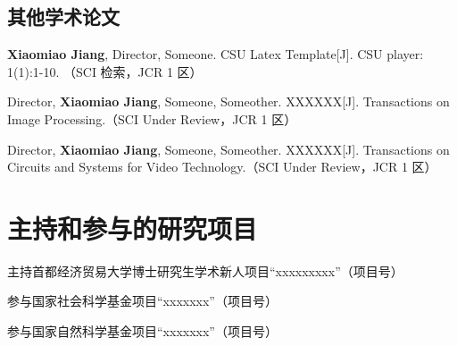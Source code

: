 \begin{additional}
\subsection*{其他学术论文}
\noindent
\begin{enumerate}[label={[\arabic*]}]
\item \textbf{Xiaomiao Jiang}, Director, Someone. CSU Latex Template[J]. CSU player: 1(1):1-10. （SCI 检索，JCR 1 区）
\item Director, \textbf{Xiaomiao Jiang}, Someone, Someother. XXXXXX[J]. Transactions on Image Processing.（SCI Under Review，JCR 1 区）
\item Director, \textbf{Xiaomiao Jiang}, Someone, Someother. XXXXXX[J]. Transactions on Circuits and Systems for Video Technology.（SCI Under Review，JCR 1 区）
\end{enumerate}

\section*{主持和参与的研究项目}
\noindent
\begin{enumerate}[label={[\arabic*]}]
\item 主持首都经济贸易大学博士研究生学术新人项目“xxxxxxxxx”（项目号）
\item 参与国家社会科学基金项目“xxxxxxx”（项目号）
\item 参与国家自然科学基金项目“xxxxxxx”（项目号）
\end{enumerate}

\end{additional}
